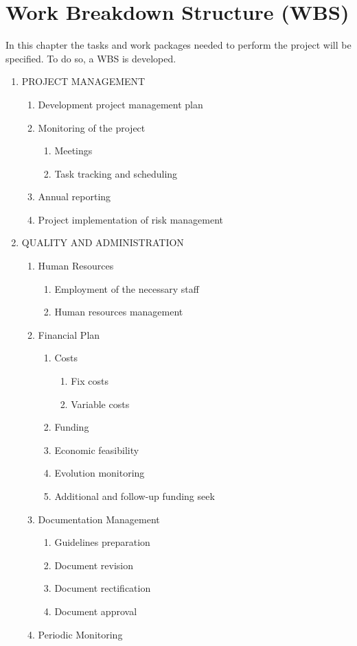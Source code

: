 \chapter{Work Breakdown Structure (WBS)}
In this chapter the tasks and work packages needed to perform the project will be specified. To do so, a WBS is developed.
\begin{enumerate}[label*=\arabic*.]
	\item PROJECT MANAGEMENT
	
	\begin{enumerate}[label*=\arabic*.]
		\item Development project management plan
		\item Monitoring of the project
		\begin{enumerate}[label*=\arabic*.]
			\item Meetings
			\item Task tracking and scheduling
		\end{enumerate}
		\item Annual reporting
		\item Project implementation of risk management
	\end{enumerate}
	
	\item QUALITY AND ADMINISTRATION
	\begin{enumerate}[label*=\arabic*.]
		\item Human Resources
		\begin{enumerate}[label*=\arabic*.]
			\item Employment of the necessary staff
			\item Human resources management
		\end{enumerate}
		\item Financial Plan
		\begin{enumerate}[label*=\arabic*.]
			\item Costs
			\begin{enumerate}[label*=\arabic*.]
				\item Fix costs
				\item Variable costs
			\end{enumerate}
			\item Funding
			\item Economic feasibility
			\item Evolution monitoring
			\item Additional and follow-up funding seek
		\end{enumerate}
		\item Documentation Management
		\begin{enumerate}[label*=\arabic*.]
			\item Guidelines preparation
			\item Document revision
			\item Document rectification
			\item Document approval
		\end{enumerate}
		\item Periodic Monitoring
	\end{enumerate}


\end{enumerate}
